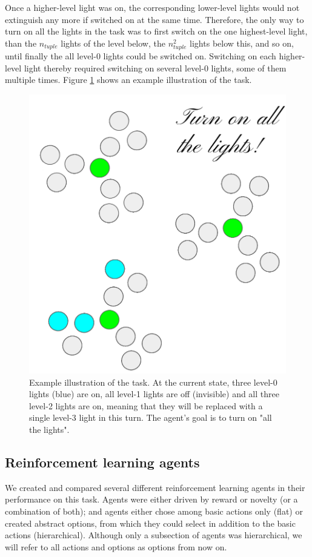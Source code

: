 \documentclass{article}
\begin{document}
Once a higher-level light was on, the corresponding lower-level lights would not extinguish any more if switched on at the same time. Therefore, the only way to turn on all the lights in the task was to first switch on the one highest-level light, than the $n_{tuple}$ lights of the level below, the $n_{tuple} ^ 2$ lights below this, and so on, until finally the all level-0 lights could be switched on. Switching on each higher-level light thereby required switching on several level-0 lights, some of them multiple times. Figure \ref{TaskFigure} shows an example illustration of the task.

\begin{figure}[h]
  \centering
  \includegraphics[width=0.5\linewidth]{NIPSfigures/Task.png}
  \caption{Example illustration of the task. At the current state, three level-0 lights (blue) are on, all level-1 lights are off (invisible) and all three level-2 lights are on, meaning that they will be replaced with a single level-3 light in this turn. The agent's goal is to turn on "all the lights".}
  \label{TaskFigure}
\end{figure}


\subsection{Reinforcement learning agents}

We created and compared several different reinforcement learning agents in their performance on this task. Agents were either driven by reward or novelty (or a combination of both); and agents either chose among basic actions only (flat) or created abstract options, from which they could select in addition to the basic actions (hierarchical). Although only a subsection of agents was hierarchical, we will refer to all actions and options as options from now on.
\end{document}
